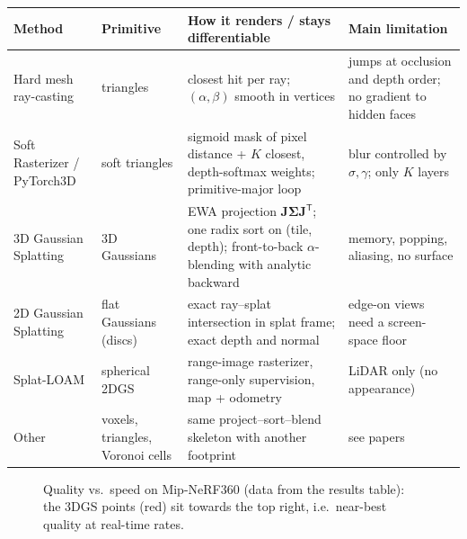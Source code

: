\documentclass[11pt,a4paper]{article}
\newcommand{\T}{^{\mathsf T}}
\theoremstyle{definition}
\theoremstyle{plain}
\theoremstyle{remark}
\begin{document}
\begin{center}
\small
\renewcommand{\arraystretch}{1.25}
\begin{tabularx}{\linewidth}{@{}p{2.45cm}p{2.3cm}XX@{}}
\toprule
Method & Primitive & How it renders / stays differentiable & Main limitation \\ \midrule
Hard mesh ray-casting & triangles & closest hit per ray; $(\alpha,\beta)$ smooth in vertices & jumps at occlusion and depth order; no gradient to hidden faces \\
Soft Rasterizer / PyTorch3D & soft triangles & sigmoid mask of pixel distance + $K$ closest, depth-softmax weights; primitive-major loop & blur controlled by $\sigma,\gamma$; only $K$ layers \\
3D Gaussian Splatting & 3D Gaussians & EWA projection $\bm J\bm\Sigma\bm J\T$; one radix sort on (tile, depth); front-to-back $\alpha$-blending with analytic backward & memory, popping, aliasing, no surface \\
2D Gaussian Splatting & flat Gaussians (discs) & exact ray--splat intersection in splat frame; exact depth and normal & edge-on views need a screen-space floor \\
Splat-LOAM & spherical 2DGS & range-image rasterizer, range-only supervision, map + odometry & LiDAR only (no appearance) \\
Other & voxels, triangles, Voronoi cells & same project--sort--blend skeleton with another footprint & see papers \\ \bottomrule
\end{tabularx}
\end{center}

\begin{figure}[htbp]
\centering
{}
\caption{Quality vs.\ speed on Mip-NeRF360 (data from the results table): the 3DGS points (red) sit towards the top right, i.e.\ near-best quality at real-time rates.}
\end{figure}
\end{document}
